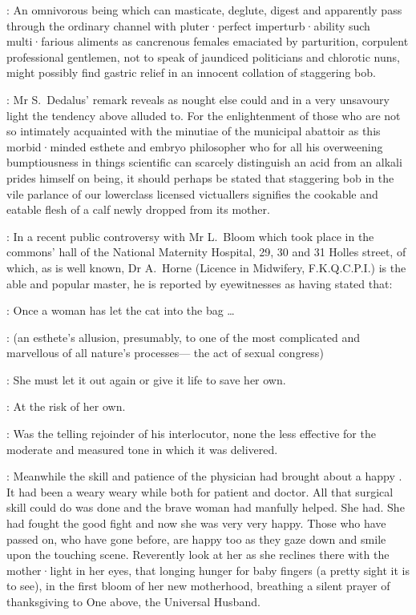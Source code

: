 \stephen:
An omnivorous being which can masticate,
deglute,
digest and apparently pass through the ordinary channel with
pluter·perfect imperturb·ability such multi·farious aliments as cancrenous females emaciated by parturition,
corpulent professional gentlemen,
not to speak of jaundiced politicians and chlorotic nuns,
might possibly find gastric relief in an innocent collation of staggering bob.

:
Mr S.~Dedalus' remark reveals as
nought else could and in a very unsavoury light the tendency above
alluded to.
For the enlightenment of those who are not so intimately
acquainted with the minutiae of the municipal abattoir as this
morbid·minded esthete and embryo philosopher who for all his overweening
bumptiousness in things scientific can scarcely distinguish an acid from
an alkali prides himself on being,
it should perhaps be stated that
staggering bob in the vile parlance of our lowerclass licensed
victuallers signifies the cookable and eatable flesh of a calf newly
dropped from its mother.

:
In a recent public controversy
with Mr L.~Bloom
which took place in the commons' hall of the National Maternity Hospital,
29, 30 and 31 Holles street,
of which,
as is well known,
Dr A.~Horne
(Licence in Midwifery, F.K.Q.C.P.I.)
is the able and popular master,
he is reported by eyewitnesses as having stated that:

\stephen:
Once a woman has let the cat into the bag \dots

:
(an esthete's allusion,
presumably,
to one of the most complicated and marvellous of all nature's processes---%
the act of sexual congress)

\stephen:
She must let it out again or give it life to save her own.

\Bloom:
At the risk of her own.

:
Was the telling rejoinder of his interlocutor,
none the less
effective for the moderate and measured tone in which it was delivered.


:
Meanwhile the skill and patience of the physician
had brought about a happy .
It had been a weary weary while both for
patient and doctor.
All that surgical skill could do was done and the
brave woman had manfully helped.
She had.
She had fought the good fight
and now she was very very happy.
Those who have passed on,
who have gone
before,
are happy too as they gaze down and smile upon the touching scene.
Reverently look at her as she reclines there with the mother·light in her eyes,
that longing hunger for baby fingers
(a pretty sight it is to see),
in the first bloom of her new motherhood,
breathing a silent prayer of
thanksgiving to One above,
the Universal Husband.

